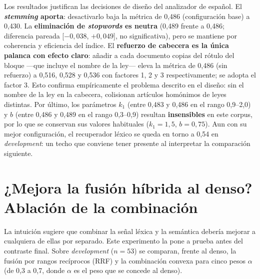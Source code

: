 Los resultados justifican las decisiones de diseño del analizador de español. El \textbf{\emph{stemming} aporta}: desactivarlo baja la métrica de 0,486 (configuración base) a 0,430. La \textbf{eliminación de \emph{stopwords} es neutra} (0,489 frente a 0,486; diferencia pareada [$-0{,}038$, $+0{,}049$], no significativa), pero se mantiene por coherencia y eficiencia del índice. El \textbf{refuerzo de cabecera es la única palanca con efecto claro}: añadir a cada documento copias del rótulo del bloque —que incluye el nombre de la ley— eleva la métrica de 0,486 (sin refuerzo) a 0,516, 0,528 y 0,536 con factores 1, 2 y 3 respectivamente; se adopta el factor 3. Esto confirma empíricamente el problema descrito en el diseño: sin el nombre de la ley en la cabecera, colisionan artículos homónimos de leyes distintas. Por último, los parámetros $k_1$ (entre 0,483 y 0,486 en el rango 0,9--2,0) y $b$ (entre 0,486 y 0,489 en el rango 0,3--0,9) resultan \textbf{insensibles} en este corpus, por lo que se conservan sus valores habituales ($k_1{=}1{,}5$, $b{=}0{,}75$). Aun con su mejor configuración, el recuperador léxico se queda en torno a 0,54 en \emph{development}: un techo que conviene tener presente al interpretar la comparación siguiente.

\section{¿Mejora la fusión híbrida al denso? Ablación de la combinación}
\label{sec:ablacion-fusion}

La intuición sugiere que combinar la señal léxica y la semántica debería mejorar a cualquiera de ellas por separado. Este experimento la pone a prueba antes del contraste final. Sobre \emph{development} ($n=53$) se comparan, frente al denso, la fusión por rangos recíprocos (RRF) y la combinación convexa para cinco pesos $\alpha$ (de 0,3 a 0,7, donde $\alpha$ es el peso que se concede al denso).

